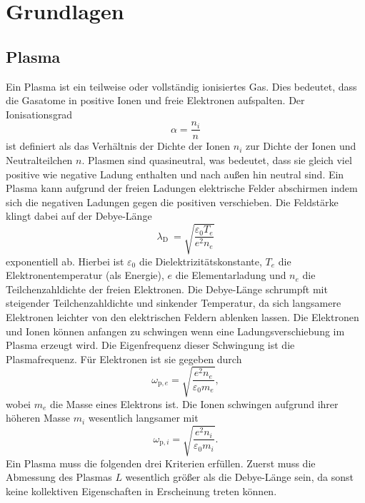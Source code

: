 \section{Grundlagen}

\subsection{Plasma}
Ein Plasma ist ein teilweise oder vollst\"andig ionisiertes Gas.
Dies bedeutet, dass die Gasatome in positive Ionen und freie Elektronen aufspalten.
Der Ionisationsgrad
\begin{equation}
\alpha
    =\frac{n_i}{n}
    \label{eq:a}
\end{equation}
ist definiert als das Verh\"altnis der Dichte der Ionen $n_i$ zur Dichte der Ionen und Neutralteilchen $n$.
Plasmen sind quasineutral, was bedeutet, dass sie gleich viel positive wie negative Ladung enthalten und nach au\ss en hin neutral sind.
Ein Plasma kann aufgrund der freien Ladungen elektrische Felder abschirmen indem sich die negativen Ladungen gegen die positiven verschieben.
Die Feldst\"arke klingt dabei auf der Debye-L\"ange
\begin{equation}
\lambda_\text{D}\
    =\sqrt{\frac{\varepsilon_0 T_e}{e^2n_e}}
    \label{eq:lD}
\end{equation}
exponentiell ab.
Hierbei ist $\varepsilon_0$ die Dielektrizit\"atskonstante, $T_e$ die Elektronentemperatur (als Energie), $e$ die Elementarladung und $n_e$ die Teilchenzahldichte der freien Elektronen.
Die Debye-L\"ange schrumpft mit steigender Teilchenzahldichte und sinkender Temperatur, da sich langsamere Elektronen leichter von den elektrischen Feldern ablenken lassen.
Die Elektronen und Ionen k\"onnen anfangen zu schwingen wenn eine Ladungsverschiebung im Plasma erzeugt wird.
Die Eigenfrequenz dieser Schwingung ist die Plasmafrequenz.
F\"ur Elektronen ist sie gegeben durch
\begin{equation}
\omega_{\text{p},e}
    =\sqrt{\frac{e^2n_e}{\varepsilon_0m_e}},
    \label{eq:wpe}
\end{equation}
wobei $m_e$ die Masse eines Elektrons ist.
Die Ionen schwingen aufgrund ihrer h\"oheren Masse $m_i$ wesentlich langsamer mit
\begin{equation}
\omega_{\text{p},i}
    =\sqrt{\frac{e^2n_i}{\varepsilon_0m_i}}.
    \label{eq:wpi}
\end{equation}
Ein Plasma muss die folgenden drei Kriterien erf\"ullen.
Zuerst muss die Abmessung des Plasmas $L$ wesentlich gr\"o\ss er als die Debye-L\"ange sein, da sonst keine kollektiven Eigenschaften in Erscheinung treten k\"onnen.
